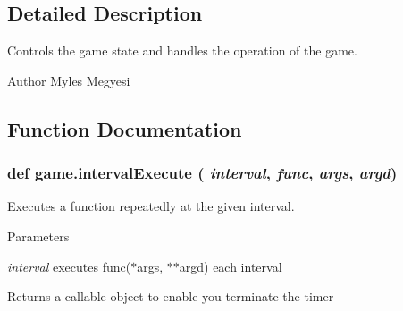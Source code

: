\subsection{Detailed Description}
Controls the game state and handles the operation of the game. \begin{DoxyAuthor}{Author}
Myles Megyesi 
\end{DoxyAuthor}


\subsection{Function Documentation}
\hypertarget{namespacegame_a40a0c38f5e2e47a449f03097213b1650}{
\subsubsection[{intervalExecute}]{\setlength{\rightskip}{0pt plus 5cm}def game.intervalExecute ( {\em interval}, \/   {\em func}, \/   {\em args}, \/   {\em argd})}}
\label{namespacegame_a40a0c38f5e2e47a449f03097213b1650}


Executes a function repeatedly at the given interval. 


\begin{DoxyParams}{Parameters}
\item[{\em interval}]executes func($\ast$args, $\ast$$\ast$argd) each interval \end{DoxyParams}
\begin{DoxyReturn}{Returns}
a callable object to enable you terminate the timer 
\end{DoxyReturn}
